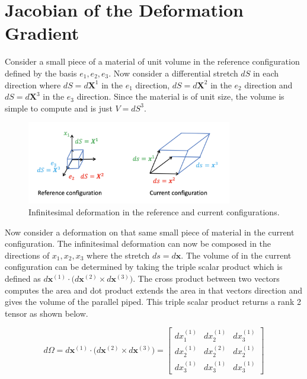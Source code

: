 \documentclass[a4paper]{article}
\begin{document}
\section{Jacobian of the Deformation Gradient}

Consider a small piece of a material of unit volume in the reference configuration defined by the basis $e_1, e_2, e_3$. Now consider a differential stretch $dS$ in each direction where $dS = d\mathbf{X}^1$ in the $e_1$ direction, $dS = d\mathbf{X}^2$ in the $e_2$ direction and $dS = d\mathbf{X}^3$ in the $e_3$ direction. Since the material is of unit size, the volume is simple to compute and is just $V = dS^3$. 

\begin{figure}[ht!]
    \centering
    \includegraphics[width=0.8\textwidth]{infinitesimal_deformation.png}
    \caption{Infinitesimal deformation in the reference and current configurations. }
    \label{fig:infinitesimal_deformation}
\end{figure}

Now consider a deformation on that same small piece of material in the current configuration. The infinitesimal deformation can now be composed in the directions of $x_1, x_2,x_3$ where the stretch $ds = d\mathbf{x}$. The volume of in the current configuration can be determined by taking the triple scalar product which is defined as $d\mathbf{x}^{(1)} \cdot \biggl(d\mathbf{x}^{(2)} \times d\mathbf{x}^{(3)} \biggr)$. The cross product between two vectors computes the area and dot product extends the area in that vectors direction and gives the volume of the parallel piped. This triple scalar product returns a rank 2 tensor  as shown below. 

\begin{equation}
    d\Omega = 
    d\mathbf{x}^{(1)} \cdot \biggl(d\mathbf{x}^{(2)} \times d\mathbf{x}^{(3)} \biggr) = \begin{bmatrix}
    dx_{1}^{(1)} & dx_{2}^{(1)} & dx_{3}^{(1)} \\
    dx_{2}^{(1)} & dx_{2}^{(2)} & dx_{2}^{(1)} \\
    dx_{3}^{(1)} & dx_{3}^{(1)} & dx_{3}^{(1)}
  \end{bmatrix}
\end{equation}
\end{document}

